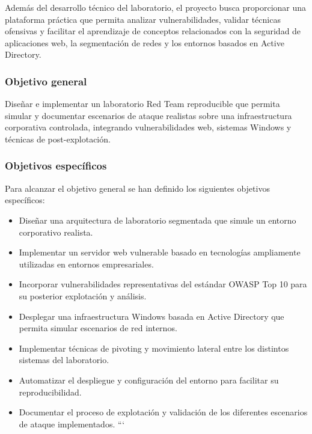 Además del desarrollo técnico del laboratorio, el proyecto busca proporcionar una plataforma práctica que permita analizar vulnerabilidades, validar técnicas ofensivas y facilitar el aprendizaje de conceptos relacionados con la seguridad de aplicaciones web, la segmentación de redes y los entornos basados en Active Directory.

\subsubsection{Objetivo general}

Diseñar e implementar un laboratorio Red Team reproducible que permita simular y documentar escenarios de ataque realistas sobre una infraestructura corporativa controlada, integrando vulnerabilidades web, sistemas Windows y técnicas de post-explotación.

\subsubsection{Objetivos específicos}

Para alcanzar el objetivo general se han definido los siguientes objetivos específicos:

\begin{itemize}
\item Diseñar una arquitectura de laboratorio segmentada que simule un entorno corporativo realista.

\item Implementar un servidor web vulnerable basado en tecnologías ampliamente utilizadas en entornos empresariales.

\item Incorporar vulnerabilidades representativas del estándar OWASP Top 10 para su posterior explotación y análisis.

\item Desplegar una infraestructura Windows basada en Active Directory que permita simular escenarios de red internos.

\item Implementar técnicas de pivoting y movimiento lateral entre los distintos sistemas del laboratorio.

\item Automatizar el despliegue y configuración del entorno para facilitar su reproducibilidad.

\item Documentar el proceso de explotación y validación de los diferentes escenarios de ataque implementados.
```

\end{itemize}

